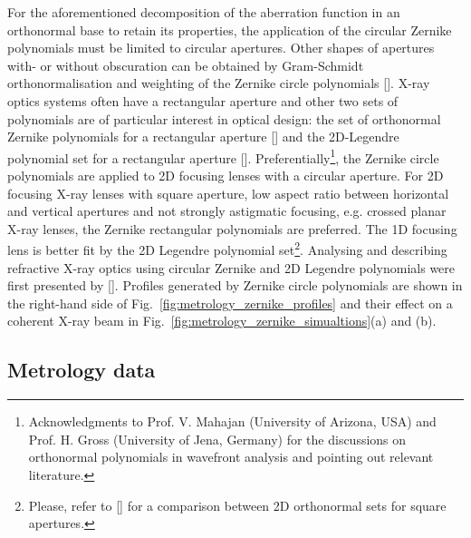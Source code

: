 \begin{refsection}
For the aforementioned decomposition of the aberration function in an orthonormal base to retain its properties, the application of the circular Zernike polynomials must be limited to circular apertures. Other shapes of apertures with- or without obscuration can be obtained by Gram-Schmidt orthonormalisation and weighting of the Zernike circle polynomials [\cite{Swantner1994,Mahajan1995}]. X-ray optics systems often have a rectangular aperture and other two sets of polynomials are of particular interest in optical design: the set of orthonormal Zernike polynomials for a rectangular aperture  [\cite{Mahajan2007}] and the 2D-Legendre polynomial set for a rectangular aperture [\cite{Mahajan2010}]. Preferentially\footnote{Acknowledgments to Prof. V. Mahajan (University of Arizona, USA) and Prof. H. Gross (University of Jena, Germany) for the discussions on orthonormal polynomials in wavefront analysis and pointing out relevant literature.}, the Zernike circle polynomials are applied to 2D focusing lenses with a circular aperture. For 2D focusing X-ray lenses with square aperture, low aspect ratio between horizontal and vertical apertures and not strongly astigmatic focusing, e.g. crossed planar X-ray lenses, the Zernike rectangular polynomials are preferred. The 1D focusing lens is better fit by the 2D Legendre polynomial set\footnote{Please, refer to [\cite{Ye2014}] for a comparison between 2D orthonormal sets for square apertures.}. Analysing and describing refractive X-ray optics using circular Zernike and 2D Legendre polynomials were first presented by [\cite{Koch2016}]. Profiles generated by Zernike circle polynomials are shown in the right-hand side of Fig.~\ref{fig:metrology_zernike_profiles} and their effect on a coherent X-ray beam in Fig.~\ref{fig:metrology_zernike_simualtions}(a) and (b).

\subsection{Metrology data}\label{sec:metrology_data}


\end{refsection}
